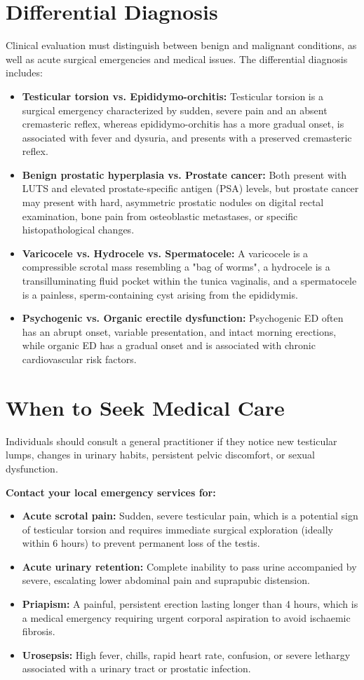 \section*{Differential Diagnosis}
Clinical evaluation must distinguish between benign and malignant conditions, as well as acute surgical emergencies and medical issues. The differential diagnosis includes:
\begin{itemize}
    \item \textbf{Testicular torsion vs. Epididymo-orchitis:} Testicular torsion is a surgical emergency characterized by sudden, severe pain and an absent cremasteric reflex, whereas epididymo-orchitis has a more gradual onset, is associated with fever and dysuria, and presents with a preserved cremasteric reflex.
    \item \textbf{Benign prostatic hyperplasia vs. Prostate cancer:} Both present with LUTS and elevated prostate-specific antigen (PSA) levels, but prostate cancer may present with hard, asymmetric prostatic nodules on digital rectal examination, bone pain from osteoblastic metastases, or specific histopathological changes.
    \item \textbf{Varicocele vs. Hydrocele vs. Spermatocele:} A varicocele is a compressible scrotal mass resembling a "bag of worms", a hydrocele is a transilluminating fluid pocket within the tunica vaginalis, and a spermatocele is a painless, sperm-containing cyst arising from the epididymis.
    \item \textbf{Psychogenic vs. Organic erectile dysfunction:} Psychogenic ED often has an abrupt onset, variable presentation, and intact morning erections, while organic ED has a gradual onset and is associated with chronic cardiovascular risk factors.
\end{itemize}

\section*{When to Seek Medical Care}
Individuals should consult a general practitioner if they notice new testicular lumps, changes in urinary habits, persistent pelvic discomfort, or sexual dysfunction.

\textbf{Contact your local emergency services for:}
\begin{itemize}
    \item \textbf{Acute scrotal pain:} Sudden, severe testicular pain, which is a potential sign of testicular torsion and requires immediate surgical exploration (ideally within 6 hours) to prevent permanent loss of the testis.
    \item \textbf{Acute urinary retention:} Complete inability to pass urine accompanied by severe, escalating lower abdominal pain and suprapubic distension.
    \item \textbf{Priapism:} A painful, persistent erection lasting longer than 4 hours, which is a medical emergency requiring urgent corporal aspiration to avoid ischaemic fibrosis.
    \item \textbf{Urosepsis:} High fever, chills, rapid heart rate, confusion, or severe lethargy associated with a urinary tract or prostatic infection.
\end{itemize}

